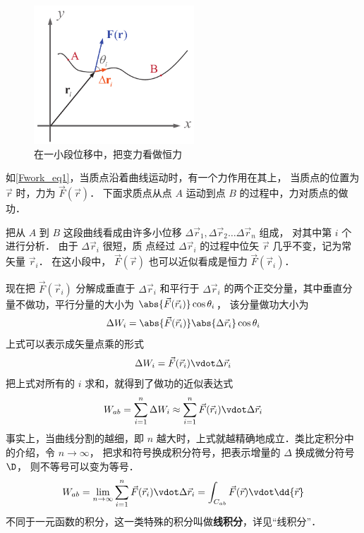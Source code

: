 

\begin{figure}[ht]
\centering
\includegraphics[width=6cm]{./figures/Fwork.pdf}
\caption{在一小段位移中，把变力看做恒力}\label{Fwork_eq1}
\end{figure}

如\autoref{Fwork_eq1}，当质点沿着曲线运动时，有一个力作用在其上， 当质点的位置为 $\vec r$ 时，力为 $\vec F(\vec r)$． 下面求质点从点 $A$ 运动到点 $B$ 的过程中，力对质点的做功．

把从 $A$ 到 $B$ 这段曲线看成由许多小位移 $\Delta \vec r_1, \Delta \vec r_2 \dots \Delta \vec r_n$ 组成， 对其中第 $i$ 个进行分析． 由于 $\Delta \vec r_i$ 很短，质
点经过 $\Delta \vec r_i$ 的过程中位矢 $\vec r$ 几乎不变，记为常矢量 $\vec r_i$． 在这小段中，  $\vec F(\vec r)$ 也可以近似看成是恒力 $\vec F(\vec r_i)$． 

现在把 $\vec F(\vec r_i)$ 分解成垂直于 $\Delta \vec r_i$ 和平行于 $\Delta \vec r_i$ 的两个正交分量，其中垂直分量不做功，平行分量的大小为 $ \abs{\vec F(\vec r_i)} \cos \theta _i$， 该分量做功大小为
\begin{equation}
\Delta W_i = \abs{\vec F(\vec r_i)} \abs{\Delta \vec r_i} \cos \theta _i
\end{equation}
上式可以表示成矢量点乘的形式
\begin{equation}\label{Fwork_eq2}
\Delta W_i = \vec F(\vec r_i) \vdot \Delta \vec r_i
\end{equation}
把上式对所有的 $i$ 求和，就得到了做功的近似表达式
\begin{equation}
W_{ab} = \sum_{i = 1}^n \Delta W_i  \approx \sum_{i = 1}^n \vec F(\vec r_i) \vdot \Delta \vec r_i 
\end{equation} 
事实上，当曲线分割的越细，即 $n$ 越大时，上式就越精确地成立．类比定积分中的介绍，令 $n \to \infty $， 把求和符号换成积分符号，把表示增量的 $\Delta $ 换成微分符号 $\D$， 则不等号可以变为等号．
\begin{equation}
W_{ab} = \lim_{n \to \infty } \sum_{i = 1}^n \vec F(\vec r_i) \vdot \Delta \vec r_i  = \int_{C_{ab}} \vec F(\vec r) \vdot \dd{\vec r}
\end{equation} 
不同于一元函数的积分，这一类特殊的积分叫做\textbf{线积分}，详见“线积分”．

